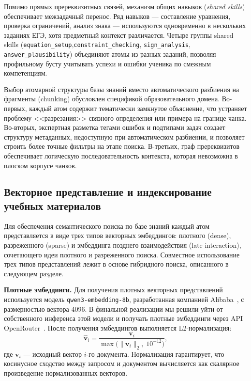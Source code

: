 \documentclass[a4paper,12pt]{extarticle}
\begin{document}
Помимо прямых пререквизитных связей, механизм общих навыков (\textit{shared skills}) обеспечивает
межзадачный перенос. Ряд навыков --- составление уравнения,
проверка ограничений, анализ знака --- используются одновременно в нескольких заданиях ЕГЭ,
хотя предметный контекст различается. Четыре группы shared skills
(\texttt{equation\_setup},\break \texttt{constraint\_checking}, \texttt{sign\_analysis},
\texttt{answer\_plausibility}) объединяют атомы из разных заданий, позволяя
профильному бусту учитывать успехи и ошибки ученика по смежным компетенциям.

Выбор атомарной структуры базы знаний вместо автоматического разбиения на фрагменты (chunking) обусловлен
спецификой образовательного домена. Во-первых, каждый атом содержит тематически
замкнутое объяснение, что устраняет проблему <<разрезания>> связного определения или
примера на границе чанка. Во-вторых, экспертная разметка тегами ошибок и подтипами
задач создает структуру метаданных, недоступную при автоматическом разбиении, и
позволяет строить более точные фильтры на этапе поиска. В-третьих, граф
пререквизитов обеспечивает логическую последовательность контекста, которая невозможна
в плоском корпусе чанков.

\subsection{Векторное представление и индексирование учебных материалов}

Для обеспечения семантического поиска по базе знаний каждый атом представляется в
виде трех типов векторных эмбеддингов: плотного (dense), разреженного (sparse) и
эмбеддинга позднего взаимодействия (late interaction), сочетающего идеи плотного
и разреженного поиска.
Совместное использование трех типов представлений лежит в основе гибридного поиска,
описанного в следующем разделе.

\textbf{Плотные эмбеддинги.} Для получения плотных векторных представлений
используется модель \texttt{qwen3-embedding-8b}, разработанная компанией
Alibaba~\cite{qwen3embedding8b}, с размерностью вектора 4096. В финальной реализации
мы решили уйти от собственного инференса этой модели и получать плотные 
эмбеддинги через API OpenRouter~\cite{openrouter2026}.
После получения эмбеддингов выполняется L2-нормализация:
\begin{equation}
    \label{eq:l2norm}
    \hat{\mathbf{v}}_i = \frac{\mathbf{v}_i}{\max\bigl(\|\mathbf{v}_i\|_2,\; 10^{-12}\bigr)},
\end{equation}
где $\mathbf{v}_i$ --- исходный вектор $i$-го документа. Нормализация гарантирует,
что косинусное сходство между запросом и документом вычисляется как скалярное
произведение нормализованных векторов.
\end{document}
